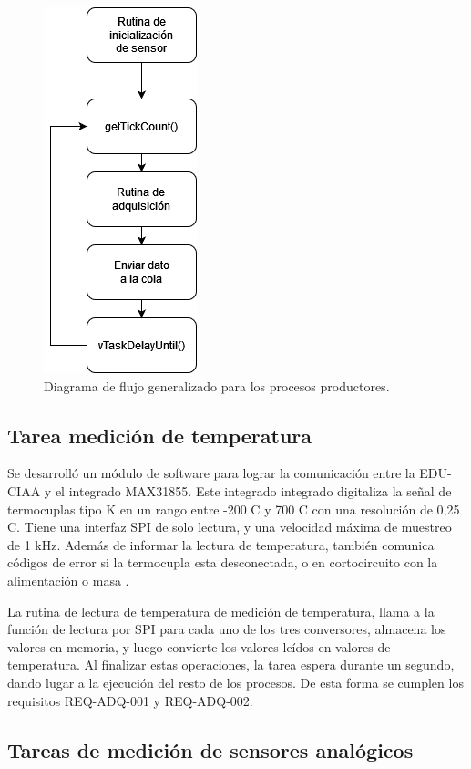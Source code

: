 \begin{figure}[htpb]
\centering
\includegraphics[width=.25\textwidth]{./Figures/flujo-productor.png}
\caption{Diagrama de flujo generalizado para los procesos productores.}
\label{fig:flujo-productor}
\end{figure}

\subsection{Tarea medición de temperatura}

Se desarrolló un módulo de software para lograr la comunicación entre la EDU-CIAA y el integrado MAX31855. Este integrado integrado digitaliza la señal de termocuplas tipo K en un rango entre -200 \degree C y 700 \degree C con una resolución de 0,25 \degree C. Tiene una interfaz SPI de solo lectura, y una velocidad máxima de muestreo de 1 kHz. Además de informar la lectura de temperatura, también comunica códigos de error si la termocupla esta desconectada, o en cortocircuito con la alimentación o masa \cite{MAX31855}. 

La rutina de lectura de temperatura de medición de temperatura, llama a la función de lectura por SPI para cada uno de los tres conversores, almacena los valores en memoria, y luego convierte los valores leídos en valores de temperatura. Al finalizar estas operaciones, la tarea espera durante un segundo, dando lugar a la ejecución del resto de los procesos. De esta forma se cumplen los requisitos REQ-ADQ-001 y REQ-ADQ-002.

\subsection{Tareas de medición de sensores analógicos}

